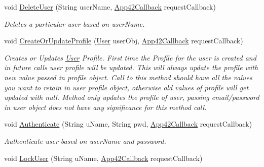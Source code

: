 \begin{DoxyCompactItemize}
void \hyperlink{classcom_1_1shephertz_1_1app42_1_1paas_1_1sdk_1_1windows_1_1user_1_1_user_service_a9d4eefc379074f616207a4a640d96b50}{Delete\+User} (String user\+Name, \hyperlink{interfacecom_1_1shephertz_1_1app42_1_1paas_1_1sdk_1_1windows_1_1_app42_callback}{App42\+Callback} request\+Callback)
\begin{DoxyCompactList}\small\item\em Deletes a particular user based on user\+Name. \end{DoxyCompactList}\item 
void \hyperlink{classcom_1_1shephertz_1_1app42_1_1paas_1_1sdk_1_1windows_1_1user_1_1_user_service_a44a22dab9f1fe4879084c884bf1a7219}{Create\+Or\+Update\+Profile} (\hyperlink{classcom_1_1shephertz_1_1app42_1_1paas_1_1sdk_1_1windows_1_1user_1_1_user}{User} user\+Obj, \hyperlink{interfacecom_1_1shephertz_1_1app42_1_1paas_1_1sdk_1_1windows_1_1_app42_callback}{App42\+Callback} request\+Callback)
\begin{DoxyCompactList}\small\item\em Creates or Updates \hyperlink{classcom_1_1shephertz_1_1app42_1_1paas_1_1sdk_1_1windows_1_1user_1_1_user}{User} Profile. First time the Profile for the user is created and in future calls user profile will be updated. This will always update the profile with new value passed in profile object. Call to this method should have all the values you want to retain in user profile object, otherwise old values of profile will get updated with null. Method only updates the profile of user, passing email/password in user object does not have any significance for this method call. \end{DoxyCompactList}\item 
void \hyperlink{classcom_1_1shephertz_1_1app42_1_1paas_1_1sdk_1_1windows_1_1user_1_1_user_service_ac0d67fe07efa022cb7bb8e3ddb75191b}{Authenticate} (String u\+Name, String pwd, \hyperlink{interfacecom_1_1shephertz_1_1app42_1_1paas_1_1sdk_1_1windows_1_1_app42_callback}{App42\+Callback} request\+Callback)
\begin{DoxyCompactList}\small\item\em Authenticate user based on user\+Name and password. \end{DoxyCompactList}\item 
void \hyperlink{classcom_1_1shephertz_1_1app42_1_1paas_1_1sdk_1_1windows_1_1user_1_1_user_service_a58ff8353f9a3de8d30299224c1d935e0}{Lock\+User} (String u\+Name, \hyperlink{interfacecom_1_1shephertz_1_1app42_1_1paas_1_1sdk_1_1windows_1_1_app42_callback}{App42\+Callback} request\+Callback)

\end{DoxyCompactItemize}
